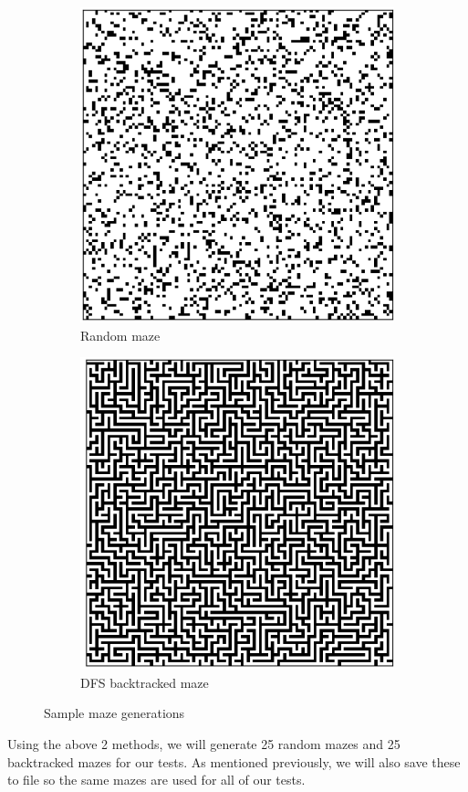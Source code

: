 \begin{figure}[H]
\begin{subfigure}{.5\textwidth}
  \centering
  \includegraphics[width=0.8\linewidth]{Report/Part0/random.png}  
  \caption{Random maze}
\end{subfigure}
\begin{subfigure}{.5\textwidth}
  \centering
  \includegraphics[width=0.8\linewidth]{Report/Part0/backtracked.png}  
  \caption{DFS backtracked maze}
\end{subfigure}
\caption{Sample maze generations}
\end{figure}

Using the above 2 methods, we will generate 25 random mazes and 25 backtracked mazes for our tests. As mentioned previously, we will also save these to file so the same mazes are used for all of our tests.